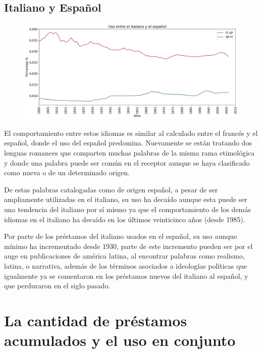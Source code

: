 \newpage
\subsection{Italiano y Español}

\begin{figure}[h!]
	\centering
	\includegraphics[scale=.38]{Cap_4/SF_4_S2_IT.png}
	\label{SF_IS}
	\caption{}
\end{figure}

El comportamiento entre estos idiomas es similar al calculado entre el francés y el español, donde el uso del español predomina.  Nuevamente se están tratando dos lenguas romances  que comparten muchas palabras de la misma rama etimológica y donde una palabra puede ser común en el receptor aunque se haya clasificado como nueva o de un determinado origen.     

De estas palabras catalogadas como de origen español,  a pesar de ser ampliamente utilizadas en el italiano, su uso ha decaído aunque esta puede ser una tendencia del italiano por sí mismo ya que el comportamiento de los demás idiomas en el italiano ha decaído en los últimos veinticinco años (desde 1985). 

Por parte de los préstamos del italiano usados en el español,  su uso aunque mínimo ha incrementado desde 1930,  parte de este incremento pueden ser por el auge en publicaciones de américa latina,  al encontrar palabras como realismo, latina, o narrativa, además de los  términos asociados a ideologías políticas que igualmente ya se comentaron en los préstamos nuevos del italiano al español, y que perduraron en el siglo pasado.



\newpage
\section{La cantidad de préstamos acumulados y el uso en conjunto}

